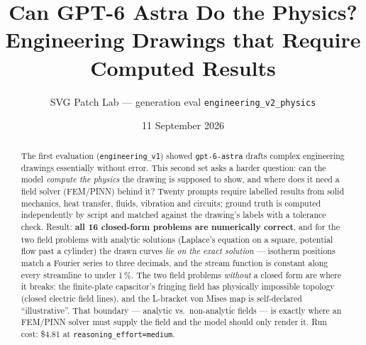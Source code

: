 \documentclass[11pt,a4paper]{article}
\title{Can GPT-6 Astra Do the Physics?\\Engineering Drawings that Require Computed Results}
\author{SVG Patch Lab --- generation eval \texttt{engineering\_v2\_physics}}
\date{11 September 2026}
\begin{document}
\maketitle

\begin{abstract}
The first evaluation (\texttt{engineering\_v1}) showed \texttt{gpt-6-astra} drafts complex engineering drawings essentially without error. This second set asks a harder question: can the model \emph{compute the physics} the drawing is supposed to show, and where does it need a field solver (FEM/PINN) behind it? Twenty prompts require labelled results from solid mechanics, heat transfer, fluids, vibration and circuits; ground truth is computed independently by script and matched against the drawing's labels with a tolerance check. Result: \textbf{all 16 closed-form problems are numerically correct}, and for the two field problems with analytic solutions (Laplace's equation on a square, potential flow past a cylinder) the drawn curves \emph{lie on the exact solution} --- isotherm positions match a Fourier series to three decimals, and the stream function is constant along every streamline to under 1\,\%. The two field problems \emph{without} a closed form are where it breaks: the finite-plate capacitor's fringing field has physically impossible topology (closed electric field lines), and the L-bracket von Mises map is self-declared ``illustrative''. That boundary --- analytic vs.\ non-analytic fields --- is exactly where an FEM/PINN solver must supply the field and the model should only render it. Run cost: \$4.81 at \texttt{reasoning\_effort=medium}.
\end{abstract}
\end{document}
